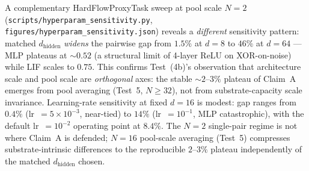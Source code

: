 \documentclass[10pt,twocolumn]{article}
\begin{document}
A complementary HardFlowProxyTask sweep at pool scale $N=2$
(\texttt{scripts/hyperparam\_sensitivity.py},
\texttt{figures/hyperparam\_sensitivity.json}) reveals a
\emph{different} sensitivity pattern: matched $d_{\mathrm{hidden}}$
\emph{widens} the pairwise gap from $1.5\%$ at $d=8$ to $46\%$ at
$d=64$ --- MLP plateaus at $\sim 0.52$ (a structural limit of
4-layer ReLU on XOR-on-noise) while LIF scales to $0.75$. This
confirms Test~(4b)'s observation that architecture scale and pool
scale are \emph{orthogonal} axes: the stable $\sim 2$--$3\%$
plateau of Claim~A emerges from pool averaging (Test~5,
$N \geq 32$), not from substrate-capacity scale invariance.
Learning-rate sensitivity at fixed $d=16$ is modest: gap ranges
from $0.4\%$ (lr~$=5 \times 10^{-3}$, near-tied) to $14\%$
(lr~$=10^{-1}$, MLP catastrophic), with the default lr~$=10^{-2}$
operating point at $8.4\%$. The $N=2$ single-pair regime is not
where Claim~A is defended; $N=16$ pool-scale averaging (Test~5)
compresses substrate-intrinsic differences to the reproducible
$2$--$3\%$ plateau independently of the matched $d_{\mathrm{hidden}}$
chosen.
\end{document}

